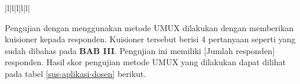 \begin{table}[H]
\begin{tabular}{|l|l|l|l|l|}
		                                                                                                                                                                                                                                                                                                  \\ \hline
	\end{tabular}
\end{table}

\par Pengujian dengan menggunakan metode UMUX dilakukan dengan memberikan kuisioner kepada responden. Kuisioner tersebut berisi 4 pertanyaan seperti yang sudah dibahas pada \textbf{BAB III}. Pengujian ini memiliki [Jumlah responden] responden. Hasil skor pengujian metode UMUX yang dilakukan dapat dilihat pada tabel \ref{sus-aplikasi-dosen} berikut.
